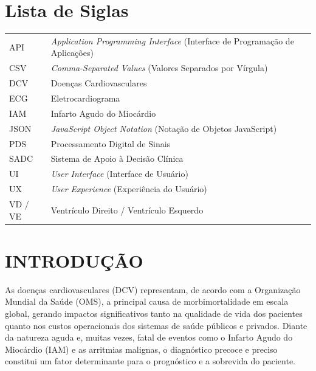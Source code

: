 \documentclass[portuguese,12pt,oneside,a4paper]{book}
\begin{document}
\chapter*{Lista de Siglas}
\begin{tabular}{ll}
    API     & \textit{Application Programming Interface} (Interface de Programação de Aplicações) \\
    CSV     & \textit{Comma-Separated Values} (Valores Separados por Vírgula) \\
    DCV     & Doenças Cardiovasculares \\
    ECG     & Eletrocardiograma \\
    IAM     & Infarto Agudo do Miocárdio \\
    JSON    & \textit{JavaScript Object Notation} (Notação de Objetos JavaScript) \\
    PDS     & Processamento Digital de Sinais \\
    SADC    & Sistema de Apoio à Decisão Clínica \\
    UI      & \textit{User Interface} (Interface de Usuário) \\
    UX      & \textit{User Experience} (Experiência do Usuário) \\
    VD / VE & Ventrículo Direito / Ventrículo Esquerdo \\
\end{tabular}

\listoffigures            
\listoftables            

\mainmatter

\fancyhead[RE,LO]{\thesection}
\onehalfspacing            %

\chapter{INTRODUÇÃO}

As doenças cardiovasculares (DCV) representam, de acordo com a Organização Mundial da Saúde (OMS), a principal causa de morbimortalidade em escala global, gerando impactos significativos tanto na qualidade de vida dos pacientes quanto nos custos operacionais dos sistemas de saúde públicos e privados. Diante da natureza aguda e, muitas vezes, fatal de eventos como o Infarto Agudo do Miocárdio (IAM) e as arritmias malignas, o diagnóstico precoce e preciso constitui um fator determinante para o prognóstico e a sobrevida do paciente. 
\end{document}
